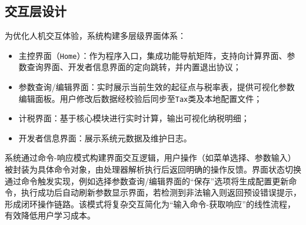 \documentclass[a4paper, utf8]{ctexart}
\begin{document}
    \subsection{交互层设计}

    为优化人机交互体验，系统构建多层级界面体系：

    \begin{itemize}[itemsep=2pt, topsep=0pt, parsep=0pt]
        \item 主控界面（\verb|Home|）：作为程序入口，集成功能导航矩阵，支持向计算界面、参数查询界面、开发者信息界面的定向跳转，并内置退出协议；
        \item 参数查询/编辑界面：实时展示当前生效的起征点与税率表，提供可视化参数编辑面板。用户修改后数据经校验后同步至\verb|Tax|类及本地配置文件；
        \item 计税界面：基于核心模块进行实时计算，输出可视化纳税明细；
        \item 开发者信息界面：展示系统元数据及维护日志。
    \end{itemize}

    系统通过命令-响应模式构建界面交互逻辑，用户操作（如菜单选择、参数输入）被封装为具体命令对象，由处理器解析执行后返回明确的操作反馈。界面状态切换通过命令触发实现，例如选择参数查询/编辑界面的“保存”选项将生成配置更新命令，执行成功后自动刷新参数显示界面，若检测到非法输入则返回预设错误提示，形成闭环操作链路。该模式将复杂交互简化为“输入命令-获取响应”的线性流程，有效降低用户学习成本。
\end{document}
